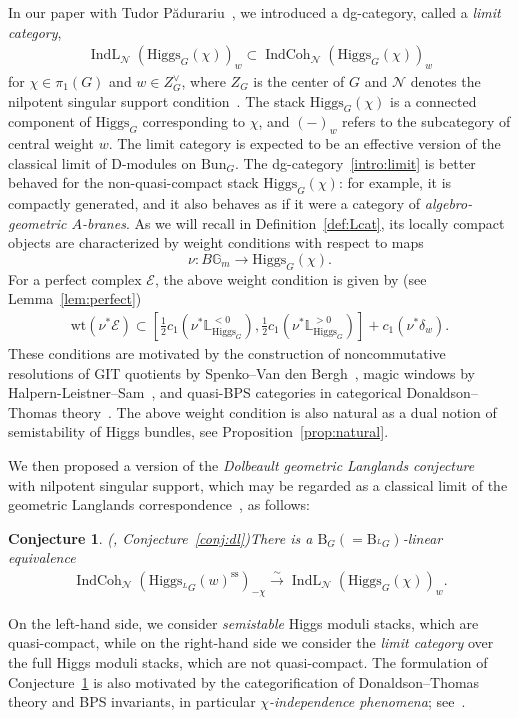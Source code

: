 \documentclass[11pt,oneside,a4paper,mathscr]{amsart}
\newtheorem{conj}[thm]{Conjecture}
\theoremstyle{definition}
\newcommand{\cE}{\mathcal{E}}
\newcommand{\bgm}{B\mathbb{G}_m}
\newcommand{\rB}{\mathrm{B}}
\newcommand{\IndCoh}{\operatorname{IndCoh}}
\newcommand{\IndL}{\operatorname{IndL}}
\newcommand{\wt}{\mathrm{wt}}
\newcommand{\Hig}{\mathrm{Higgs}}
\newcommand{\Bun}{\mathrm{Bun}}
\begin{document}
In our paper with Tudor P\u{a}durariu~\cite{PTlim}, we introduced a dg-category, called a
\emph{limit category},
\begin{align}\label{intro:limit}
    \IndL_{\mathcal{N}}(\Hig_G(\chi))_w \subset \IndCoh_{\mathcal{N}}(\Hig_G(\chi))_w
\end{align}
for $\chi \in \pi_1(G)$ and $w\in Z_G^{\vee}$, where $Z_G$ is the center of $G$ and
$\mathcal{N}$ denotes the nilpotent singular support condition~\cite{AG}.
The stack $\Hig_G(\chi)$ is a connected component of $\Hig_G$ corresponding to $\chi$, and $(-)_w$ refers to the subcategory of central weight $w$. 
The limit category is expected to be an effective version of the classical limit of D-modules on $\Bun_G$. The dg-category~\eqref{intro:limit} is 
better behaved for the non-quasi-compact stack $\Hig_G(\chi)$: for example, it is compactly generated, and it also behaves as if it were a category of \textit{algebro-geometric $A$-branes}. 
As we will recall in Definition~\ref{def:Lcat}, its locally compact objects are
characterized by weight conditions with respect to maps
\[
    \nu \colon \bgm \to \Hig_G(\chi).
\]
For a perfect complex $\cE$, the above weight condition is given by 
(see Lemma~\ref{lem:perfect})
\begin{align*}
    \wt(\nu^* \cE) \subset \left[ \frac{1}{2}c_1(\nu^* \mathbb{L}_{\Hig_G}^{<0}), \frac{1}{2}c_1(\nu^* \mathbb{L}_{\Hig_G}^{>0}) \right] +c_1(\nu^* \delta_{w}).
\end{align*}
These conditions are motivated by the construction of noncommutative
resolutions of GIT quotients by Spenko--Van den Bergh~\cite{SvdB},
magic windows by Halpern-Leistner--Sam~\cite{hls}, and quasi-BPS
categories in categorical Donaldson--Thomas theory~\cite{T, PT0, PT1, PTquiver, PThiggs, PThiggs2}. The above weight condition is also natural 
as a dual notion of semistability of Higgs bundles, see Proposition~\ref{prop:natural}.

We then proposed a version of the \emph{Dolbeault geometric Langlands conjecture}~\cite{DoPa}
with nilpotent singular support, which may be regarded as
a classical limit of the 
geometric Langlands correspondence~\cite{BD0, AG, GLC1, GLC2, GLC3, GLC4, GLC5}, as follows:
\begin{conj}\emph{(\cite[Conjecture~1.1]{PTlim}, Conjecture~\ref{conj:dl})}\label{conj:intro}
    There is a $\rB_G(=\rB_{{}^{L}G})$-linear equivalence
    \begin{align}\label{intro:IndL}
        \IndCoh_{\mathcal{N}}(\Hig_{{}^{L}G}(w)^{\mathrm{ss}})_{-\chi} \stackrel{\sim}{\to}
        \IndL_{\mathcal{N}}(\Hig_G(\chi))_w.
    \end{align}
\end{conj}
On the left-hand side, we consider \textit{semistable} Higgs moduli stacks, which are quasi-compact, while on the right-hand side we consider the \textit{limit category} over the full Higgs moduli stacks, which are not quasi-compact. 
The formulation of Conjecture~\ref{conj:intro} is also motivated by the categorification of Donaldson--Thomas theory and BPS invariants, in particular \textit{$\chi$-independence phenomena}; see~\cite[Section~1]{PTlim}.
\end{document}
